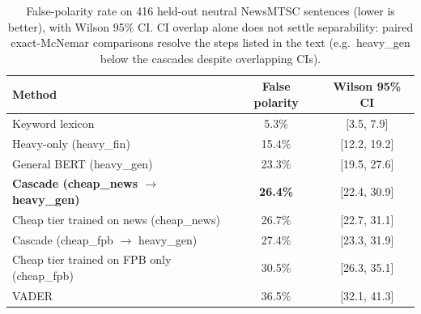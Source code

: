 \documentclass{article}
\begin{document}
\begin{table}[ht]
\centering
\caption{False-polarity rate on 416 held-out neutral NewsMTSC sentences (lower is better), with Wilson 95\% CI. CI overlap alone does not settle separability: paired exact-McNemar comparisons resolve the steps listed in the text (e.g.\ heavy\_gen below the cascades despite overlapping CIs).}
\label{tab:newsmt_border}
\small
\begin{tabular}{lcc}
\toprule
Method & False polarity & Wilson 95\% CI \\
\midrule
Keyword lexicon & 5.3\% & [3.5, 7.9] \\
Heavy-only (heavy\_fin) & 15.4\% & [12.2, 19.2] \\
General BERT (heavy\_gen) & 23.3\% & [19.5, 27.6] \\
\textbf{Cascade (cheap\_news $\rightarrow$ heavy\_gen)} & \textbf{26.4\%} & [22.4, 30.9] \\
Cheap tier trained on news (cheap\_news) & 26.7\% & [22.7, 31.1] \\
Cascade (cheap\_fpb $\rightarrow$ heavy\_gen) & 27.4\% & [23.3, 31.9] \\
Cheap tier trained on FPB only (cheap\_fpb) & 30.5\% & [26.3, 35.1] \\
VADER & 36.5\% & [32.1, 41.3] \\
\bottomrule
\end{tabular}
\end{table}
\end{document}
